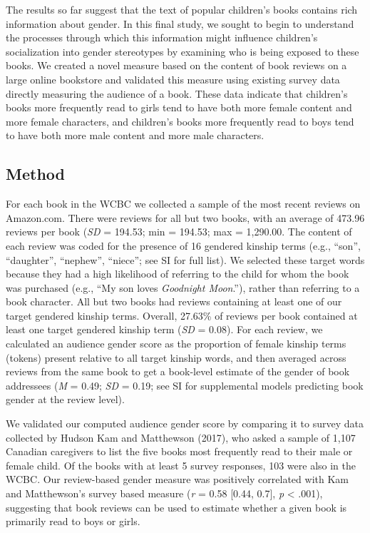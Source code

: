 \documentclass[english,,man,floatsintext]{apa6}
\begin{document}
The results so far suggest that the text of popular children's books contains rich information about gender. In this final study, we sought to begin to understand the processes through which this information might influence children's socialization into gender stereotypes by examining who is being exposed to these books. We created a novel measure based on the content of book reviews on a large online bookstore and validated this measure using existing survey data directly measuring the audience of a book. These data indicate that children's books more frequently read to girls tend to have both more female content and more female characters, and children's books more frequently read to boys tend to have both more male content and more male characters.

\hypertarget{method-1}{%
\subsection{Method}\label{method-1}}

For each book in the WCBC we collected a sample of the most recent reviews on Amazon.com. There were reviews for all but two books, with an average of 473.96 reviews per book (\emph{SD} = 194.53; min = 194.53; max = 1,290.00. The content of each review was coded for the presence of 16 gendered kinship terms (e.g., \enquote{son}, \enquote{daughter}, \enquote{nephew}, \enquote{niece}; see SI for full list). We selected these target words because they had a high likelihood of referring to the child for whom the book was purchased (e.g., \enquote{My son loves \emph{Goodnight Moon}.}), rather than referring to a book character. All but two books had reviews containing at least one of our target gendered kinship terms. Overall, 27.63\% of reviews per book contained at least one target gendered kinship term (\emph{SD} = 0.08). For each review, we calculated an audience gender score as the proportion of female kinship terms (tokens) present relative to all target kinship words, and then averaged across reviews from the same book to get a book-level estimate of the gender of book addressees (\emph{M} = 0.49; \emph{SD} = 0.19; see SI for supplemental models predicting book gender at the review level).

We validated our computed audience gender score by comparing it to survey data collected by Hudson Kam and Matthewson (2017), who asked a sample of 1,107 Canadian caregivers to list the five books most frequently read to their male or female child. Of the books with at least 5 survey responses, 103 were also in the WCBC. Our review-based gender measure was positively correlated with Kam and Matthewson's survey based measure (\emph{r} = 0.58 {[}0.44, 0.7{]}, \emph{p} \textless{} .001), suggesting that book reviews can be used to estimate whether a given book is primarily read to boys or girls.
\end{document}
